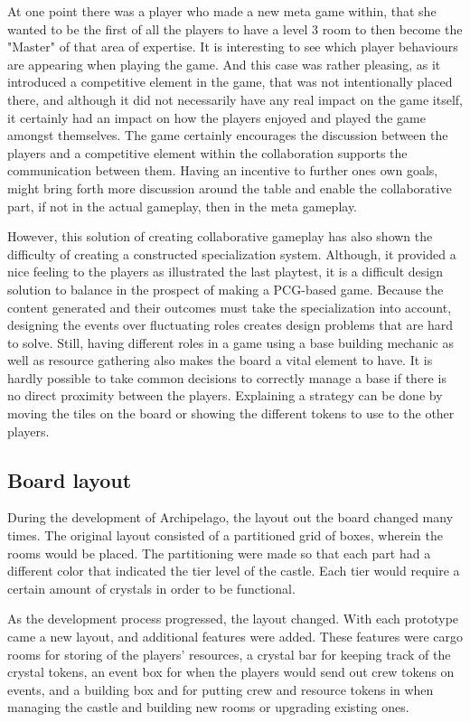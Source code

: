 At one point there was a player who made a new meta game within, that she wanted to be the first of all the players to have a level 3 room to then become the "Master" of that area of expertise. It is interesting to see which player behaviours are appearing when playing the game. And this case was rather pleasing, as it introduced a competitive element in the game, that was not intentionally placed there, and although it did not necessarily have any real impact on the game itself, it certainly had an impact on how the players enjoyed and played the game amongst themselves. The game certainly encourages the discussion between the players and a competitive element within the collaboration supports the communication between them. 
Having an incentive to further ones own goals, might bring forth more discussion around the table and enable the collaborative part, if not in the actual gameplay, then in the meta gameplay.

However, this solution of creating collaborative gameplay has also shown the difficulty of creating a constructed specialization system. Although, it provided a nice feeling to the players as illustrated the last playtest, it is a difficult design solution to balance in the prospect of making a PCG-based game. Because the content generated and their outcomes must take the specialization into account, designing the events over fluctuating roles creates design problems that are hard to solve. Still, having different roles in a game using a base building mechanic as well as resource gathering also makes the board a vital element to have. It is hardly possible to take common decisions to correctly manage a base if there is no direct proximity between the players. Explaining a strategy can be done by moving the tiles on the board or showing the different tokens to use to the other players. 




\subsection{Board layout}
During the development of Archipelago, the layout out the board changed many times. The original layout consisted of a partitioned grid of boxes, wherein the rooms would be placed. The partitioning were made so that each part had a different color that indicated the tier level of the castle. Each tier would require a certain amount of crystals in order to be functional. 

As the development process progressed, the layout changed. With each prototype came a new layout, and additional features were added. These features were cargo rooms for storing of the players' resources, a crystal bar for keeping track of the crystal tokens, an event box for when the players would send out crew tokens on events, and a building box and for putting crew and resource tokens in when managing the castle and building new rooms or upgrading existing ones. 

